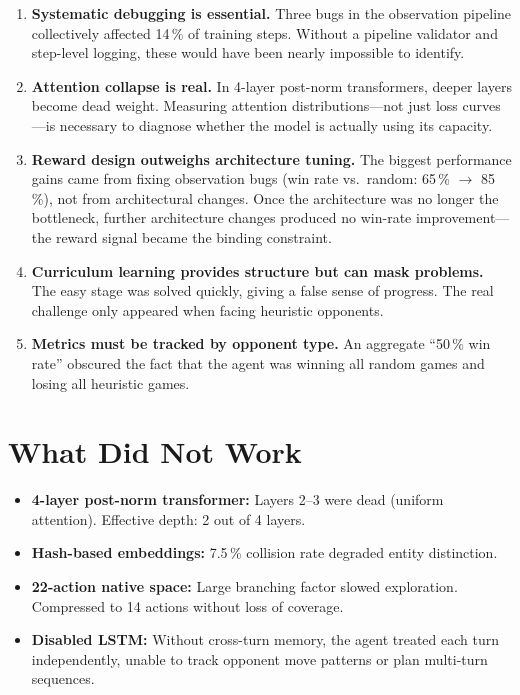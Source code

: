 \begin{enumerate}
  \item \textbf{Systematic debugging is essential.}  Three bugs in the
        observation pipeline collectively affected 14\,\% of training steps.
        Without a pipeline validator and step-level logging, these would have
        been nearly impossible to identify.

  \item \textbf{Attention collapse is real.}  In 4-layer post-norm
        transformers, deeper layers become dead weight.  Measuring attention
        distributions---not just loss curves---is necessary to diagnose whether
        the model is actually using its capacity.

  \item \textbf{Reward design outweighs architecture tuning.}  The biggest
        performance gains came from fixing observation bugs (win rate vs.\
        random: 65\,\% $\to$ 85\,\%), not from architectural changes.  Once
        the architecture was no longer the bottleneck, further architecture
        changes produced no win-rate improvement---the reward signal became
        the binding constraint.

  \item \textbf{Curriculum learning provides structure but can mask problems.}
        The easy stage was solved quickly, giving a false sense of progress.
        The real challenge only appeared when facing heuristic opponents.

  \item \textbf{Metrics must be tracked by opponent type.}  An aggregate
        ``50\,\% win rate'' obscured the fact that the agent was winning all
        random games and losing all heuristic games.
\end{enumerate}

\section{What Did Not Work}

\begin{itemize}
  \item \textbf{4-layer post-norm transformer:} Layers 2--3 were dead (uniform
        attention).  Effective depth: 2 out of 4 layers.
  \item \textbf{Hash-based embeddings:} 7.5\,\% collision rate degraded entity
        distinction.
  \item \textbf{22-action native space:} Large branching factor slowed
        exploration.  Compressed to 14 actions without loss of coverage.
  \item \textbf{Disabled LSTM:} Without cross-turn memory, the agent treated
        each turn independently, unable to track opponent move patterns or
        plan multi-turn sequences.
\end{itemize}

